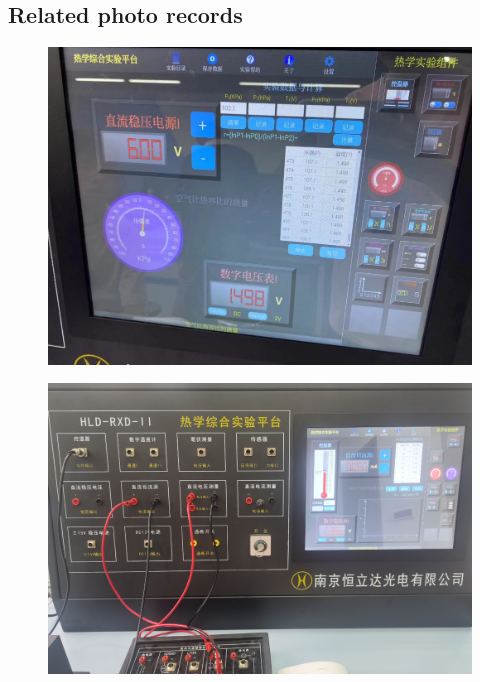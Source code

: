 \documentclass[UTF8]{article}
\begin{document}
\begin{appendix}
	\section{Related photo records}
	\begin{figure}[H]
	            	\centering
	            	\includegraphics[clip,scale=0.5,trim={0 0 0 0}]{fig/fig11.png}
	            	\label{figure.16}
	\end{figure}
	\begin{figure}[H]
	            	\centering
	            	\includegraphics[clip,scale=0.5,trim={0 0 0 0}]{fig/fig12.png}
	            	\label{figure.15}
	\end{figure}
	\begin{figure}[H]
	            	\centering

\end{figure}
\end{appendix}
\end{document}
